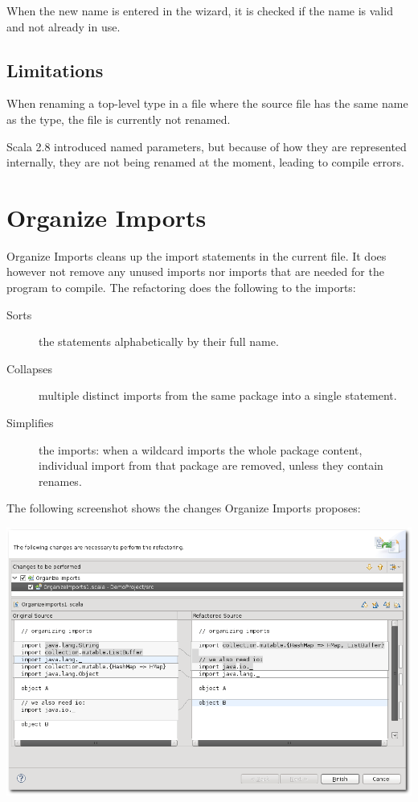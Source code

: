 \documentclass[10pt,a4paper,oneside]{scrreprt}
\begin{document}
When the new name is entered in the wizard, it is checked if the name is valid and not already in use.

\subsection{Limitations}

When renaming a top-level type in a file where the source file has the same name as the type, the file is currently not renamed. 

Scala 2.8 introduced named parameters, but because of how they are represented internally, they are not being renamed at the moment, leading to compile errors.

\section{Organize Imports}

Organize Imports cleans up the import statements in the current file. It does however not remove any unused imports nor imports that are needed for the program to compile. The refactoring does the following to the imports:

\begin{description}
  \item[Sorts] the statements alphabetically by their full name.
  \item[Collapses] multiple distinct imports from the same package into a single statement.
  \item[Simplifies] the imports: when a wildcard imports the whole package content, individual import from that package are removed, unless they contain renames.
\end{description}

The following screenshot shows the changes Organize Imports proposes:

\begin{center}
  \includegraphics[width=\linewidth]{organize_screenshot_1.png}
\end{center}
\end{document}

